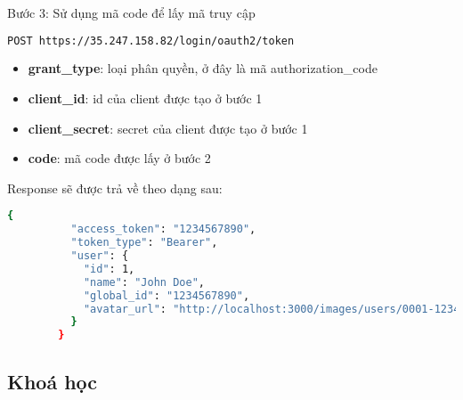 \documentclass[../Thesis.tex]{subfiles}
\begin{document}
      Bước 3: Sử dụng mã code để lấy mã truy cập
      \begin{lstlisting}[language=bash]
          POST https://35.247.158.82/login/oauth2/token
      \end{lstlisting}
      \begin{itemize}
        \item \textbf{grant\_type}: loại phân quyền, ở đây là mã authorization\_code
        \item \textbf{client\_id}: id của client được tạo ở bước 1
        \item \textbf{client\_secret}: secret của client được tạo ở bước 1
        \item \textbf{code}: mã code được lấy ở bước 2
      \end{itemize}

      Response sẽ được trả về theo dạng sau:
      \begin{lstlisting}[language=bash]
        {
          "access_token": "1234567890",
          "token_type": "Bearer",
          "user": {
            "id": 1,
            "name": "John Doe",
            "global_id": "1234567890",
            "avatar_url": "http://localhost:3000/images/users/0001-1234567890/avatar.png"
          }
        }
      \end{lstlisting}

      \subsection{Khoá học}
\end{document}
